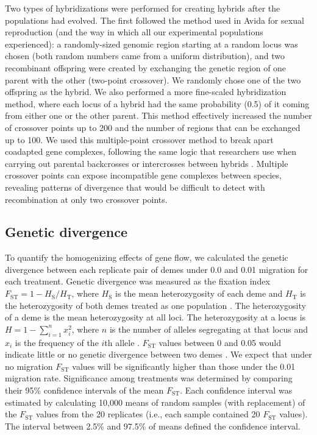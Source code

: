 \begin{doublespace}
Two types of hybridizations were performed for creating hybrids
after the populations had evolved.
%
The first followed the method used in Avida for sexual reproduction
(and the way in which all our experimental populations experienced):
a randomly-sized genomic region starting at a random locus was chosen
(both random numbers came from a uniform distribution),
and two recombinant offspring were created by exchanging
the genetic region of one parent with the other (two-point crossover).
%
We randomly chose one of the two offspring as the hybrid.
%
We also performed a more fine-scaled hybridization method,
where each locus of a hybrid had the same probability (0.5)
of it coming from either one or the other parent.
%
This method effectively increased the number of crossover points up to 200
and the number of regions that can be exchanged up to 100.
%
We used this multiple-point crossover method
to break apart coadapted gene complexes,
following the same logic that researchers
use when carrying out parental backcrosses
or intercrosses between hybrids \citep[e.g.,][]{li97,bur99}.
%
Multiple crossover points can expose
incompatible gene complexes between species,
revealing patterns of divergence
that would be difficult to detect with
recombination at only two crossover points.



\subsection{Genetic divergence}



To quantify the homogenizing effects of gene flow,
we calculated the genetic divergence
between each replicate pair of demes
under 0.0 and 0.01 migration for each treatment.
%
Genetic divergence was measured as the fixation index
$F_{\mathrm{ST}} = 1 - H_{\mathrm{S}} / H_{\mathrm{T}}$,
where $H_{\mathrm{S}}$ is the mean heterozygosity of each deme
and $H_{\mathrm{T}}$ is the heterozygosity of both demes
treated as one population \citep[p. 118]{har97}.
%
The heterozygosity of a deme
is the mean heterozygosity at all loci.
%
The heterozygosity at a locus is $H = 1 - \sum_{i = 1}^{n} x_i^{2}$,
where $n$ is the number of alleles segregating at that locus
and $x_i$ is the frequency of the $i$th allele \citep[p. 15]{gil04}.
%
$F_{\mathrm{ST}}$ values between 0 and 0.05
would indicate little or no genetic divergence
between two demes \citep[p. 118]{har97}.
%
We expect that under no migration
$F_{\mathrm{ST}}$ values will be significantly higher
than those under the 0.01 migration rate.
%
Significance among treatments was determined by comparing their
95\% confidence intervals of the mean $F_{\mathrm{ST}}$.
%
Each confidence interval was estimated by calculating 10,000 means
of random samples (with replacement) of the $F_{\mathrm{ST}}$ values
from the 20 replicates
(i.e., each sample contained 20 $F_{\mathrm{ST}}$ values).
%
The interval between 2.5\% and 97.5\% of means defined the confidence interval.




\end{doublespace}
